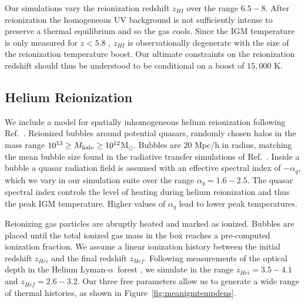 \documentclass[a4paper,11pt]{article}
\newcommand{\Lya}{Lyman-$\alpha$}
\begin{document}
Our simulations vary the reionization redshift $z_{HI}$ over the range $6.5 - 8$. After reionization the homogeneous UV background is not sufficiently intense to preserve a thermal equilibrium and so the gas cools. Since the IGM temperature is only measured for $z < 5.8$ \cite{Gaikwad:2020}, $z_{HI}$ is observationally degenerate with the size of the reionization temperature boost. Our ultimate constraints on the reionization redshift should thus be understood to be conditional on a boost of $15,000$ K.




\subsection{Helium Reionization}
\label{sec:helium}

We include a model for spatially inhomogeneous helium reionization following Ref.~\cite{UptonSanderbeck:2020}. Reionized bubbles around potential quasars, randomly chosen halos in the mass range $10^{13} \geq M_{\rm halo}\geq 10^{12}$M$_{\odot}$. Bubbles are $20$ Mpc/h in radius, matching the mean bubble size found in the radiative transfer simulations of Ref.~\citep{McQuinn:2009}. Inside a bubble a quasar radiation field is assumed with an effective spectral index of $ - \alpha_q$, which we vary in our simulation suite over the range $\alpha_q  = 1.6 - 2.5$. The quasar spectral index controls the level of heating during helium reionization and thus the peak IGM temperature. Higher values of $\alpha_q$ lead to lower peak temperatures.

Reionizing gas particles are abruptly heated and marked as ionized. Bubbles are placed until the total ionized gas mass in the box reaches
a pre-computed ionization fraction. We assume a linear ionization history between the initial redshift $z_{Hei}$ and the final redshift $z_{Hef}$. Following measurements of the optical depth in the Helium \Lya~forest \cite{Worseck:2019}, we simulate in the range $z_{Hei} = 3.5 -  4.1$ and $z_{Hef} = 2.6 - 3.2$. Our three free parameters allow us to generate a wide range of thermal histories, as shown in Figure~\ref{fig:meanigmtempdens}.
\end{document}
